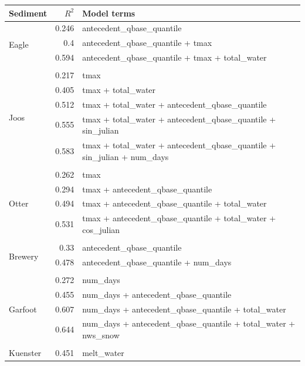 \documentclass[10pt]{article}
\begin{document}
\begin{table}[h] \small
    \begin{center}
    \begin{tabular}{lrl}
    \textbf{Sediment} & $R^2$ & Model terms \\
    \hline
\multirow{4}{*}{Eagle} & 0.246 & antecedent\_qbase\_quantile\\ 
 & 0.4 & antecedent\_qbase\_quantile + tmax\\ 
 & 0.594 & antecedent\_qbase\_quantile + tmax + total\_water\\ 
\vspace{2mm}\\ \multirow{6}{*}{Joos} & 0.217 & tmax\\ 
 & 0.405 & tmax + total\_water\\ 
 & 0.512 & tmax + total\_water + antecedent\_qbase\_quantile\\ 
 & 0.555 & tmax + total\_water + antecedent\_qbase\_quantile + sin\_julian\\ 
 & 0.583 & tmax + total\_water + antecedent\_qbase\_quantile + sin\_julian + num\_days\\ 
\vspace{2mm}\\ \multirow{5}{*}{Otter} & 0.262 & tmax\\ 
 & 0.294 & tmax + antecedent\_qbase\_quantile\\ 
 & 0.494 & tmax + antecedent\_qbase\_quantile + total\_water\\ 
 & 0.531 & tmax + antecedent\_qbase\_quantile + total\_water + cos\_julian\\ 
\vspace{2mm}\\ \multirow{3}{*}{Brewery} & 0.33 & antecedent\_qbase\_quantile\\ 
 & 0.478 & antecedent\_qbase\_quantile + num\_days\\ 
\vspace{2mm}\\ \multirow{5}{*}{Garfoot} & 0.272 & num\_days\\ 
 & 0.455 & num\_days + antecedent\_qbase\_quantile\\ 
 & 0.607 & num\_days + antecedent\_qbase\_quantile + total\_water\\ 
 & 0.644 & num\_days + antecedent\_qbase\_quantile + total\_water + nws\_snow\\ 
\vspace{2mm}\\ \multirow{4}{*}{Kuenster} & 0.451 & melt\_water\\ 

\end{tabular}
\end{center}
\end{table}
\end{document}
